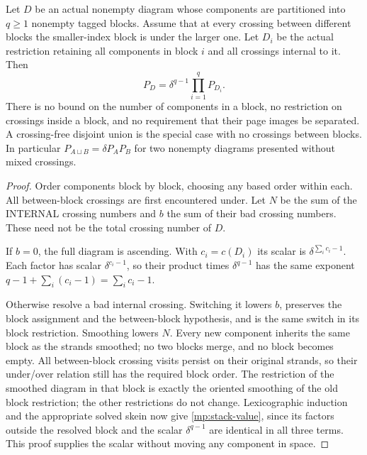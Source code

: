 \begin{theorem}
\label{mp:stack}\leanok
Let $D$ be an actual nonempty diagram whose components are partitioned
into $q\geq1$ nonempty tagged blocks. Assume that at every crossing
between different blocks the smaller-index block is under the larger
one. Let $D_i$ be the actual restriction retaining all components in
block $i$ and all crossings internal to it. Then
\begin{equation}\label{mp:stack-value}
 P_D=\delta^{q-1}\prod_{i=1}^qP_{D_i}.
\end{equation}
There is no bound on the number of components in a block, no restriction
on crossings inside a block, and no requirement that their page images
be separated. A crossing-free disjoint union is the special case with
no crossings between blocks. In particular
$P_{A\sqcup B}=\delta P_AP_B$ for two nonempty diagrams presented
without mixed crossings.

\end{theorem}
\begin{proof}\leanok
Order components block by block, choosing any based order within each.
All between-block crossings are first encountered under. Let $N$ be
the sum of the INTERNAL crossing numbers and $b$ the sum of their bad
crossing numbers. These need not be the total crossing number of $D$.

If $b=0$, the full diagram is ascending. With $c_i=c(D_i)$ its scalar
is $\delta^{\sum_i c_i-1}$. Each factor has scalar
$\delta^{c_i-1}$, so their product times $\delta^{q-1}$ has the same
exponent $q-1+\sum_i(c_i-1)=\sum_i c_i-1$.

Otherwise resolve a bad internal crossing. Switching it lowers $b$,
preserves the block assignment and the between-block hypothesis, and
is the same switch in its block restriction. Smoothing lowers $N$.
Every new component inherits the same block as the strands smoothed;
no two blocks merge, and no block becomes empty. All between-block
crossing visits persist on their original strands, so their under/over
relation still has the required block order. The restriction of the
smoothed diagram in that block is exactly the oriented smoothing of
the old block restriction; the other restrictions do not change.
Lexicographic induction and the appropriate solved skein now give
\eqref{mp:stack-value}, since its factors outside the resolved block
and the scalar $\delta^{q-1}$ are identical in all three terms.
This proof supplies the scalar without moving any component in space.
\end{proof}

